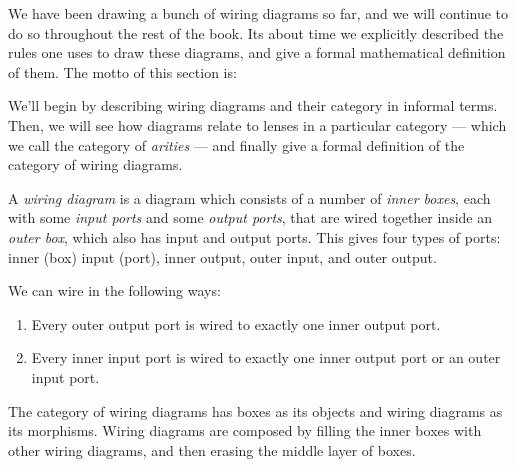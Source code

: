 \documentclass[DynamicalBook]{subfiles}
\begin{document}
We have been drawing a bunch of wiring diagrams so far, and we will continue to
do so throughout the rest of the book. Its about time we explicitly described
the rules one uses to draw these diagrams, and give a formal mathematical
definition of them. The motto of this section is:

We'll begin by describing wiring diagrams and their category in informal terms.
Then, we will see how diagrams relate to lenses in a particular category --- which we call the
category of \emph{arities} --- and finally give a formal definition of the
category of wiring diagrams.


\begin{informal}
  A \emph{wiring diagram} is a diagram which consists of a number of \emph{inner
  boxes}, each with some \emph{input ports} and some \emph{output ports}, that are wired
together inside an \emph{outer box}, which also has input and output ports. This gives four types of ports: inner (box) input (port), inner output, outer input, and outer output. 

We can wire in the following ways:
\begin{enumerate}
  \item Every outer output port is wired to exactly one inner output port.
  \item Every inner input port is wired to exactly one inner output port or an
    outer input port.
\end{enumerate}

The category of wiring diagrams has boxes as its objects and wiring diagrams as
its morphisms. Wiring diagrams are composed by filling the inner boxes with other wiring
diagrams, and then erasing the middle layer of boxes.


\end{informal}
\end{document}
